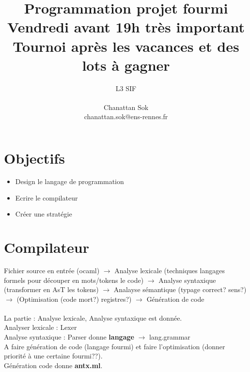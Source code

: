 \documentclass[11pt]{article}
\title{Programmation projet fourmi\\Vendredi avant 19h très important\\Tournoi après les vacances et des lots à gagner}
\author{L3 SIF\\\\Chanattan Sok\\chanattan.sok@ens-rennes.fr}
\begin{document}
\maketitle
\section{Objectifs}
\begin{itemize}
	\item Design le langage de programmation
	\item Ecrire le compilateur
	\item Créer une stratégie
\end{itemize}
\section{Compilateur}
Fichier source en entrée (ocaml) $\to$ Analyse lexicale (techniques langages formels pour découper en mots/tokens le code) $\to$ Analyse syntaxique (transformer en AsT les tokens) $\to$ Analayse sémantique (typage correct? sens?) $\to$ (Optimisation (code mort?) registres?) $\to$ Génération de code\\\\
La partie : Analyse lexicale, Analyse syntaxique est donnée.\\
Analyser lexicale : Lexer\\
Analyse syntaxique : Parser donne \textbf{langage} $\to$ lang.grammar\\
A faire génération de code (langage fourmi) et faire l'optimisation (donner priorité à une certaine fourmi??).\\
Génération code donne \textbf{antx.ml}.
\end{document}
